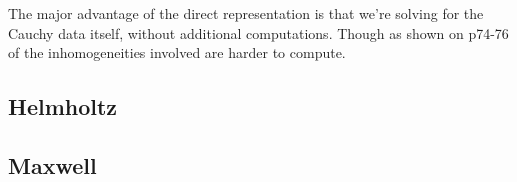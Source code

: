 \documentclass[12pt, a4, twoside]{article}
\begin{document}
The major advantage of the direct representation is that we're solving for the Cauchy data itself, without additional computations. Though as shown on p74-76 of \cite{kress2012} the inhomogeneities involved are harder to compute.

\subsection{Helmholtz}

\subsection{Maxwell}

\printbibliography[heading=bibintoc]
\end{document}
